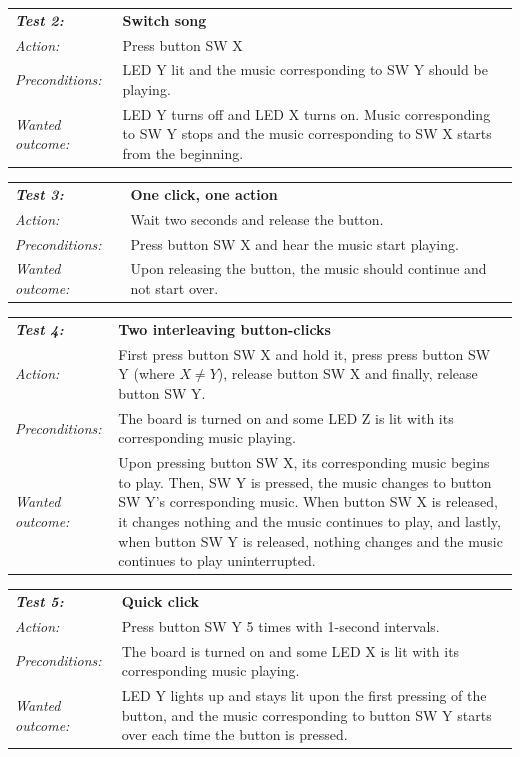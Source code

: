 \documentclass[a4paper,12pt]{article}
\begin{document}
\begin{tabular}[h]{|lp{12cm}|} \hline
\textbf{\emph{Test 2:}} 		& \textbf{Switch song}\\
\emph{Action:} 		& Press button SW X\\
\emph{Preconditions:}	& LED Y lit and the music corresponding to SW Y should be playing.\\
\emph{Wanted outcome:}	& LED Y turns off and LED X turns on. Music corresponding to SW Y stops and the music corresponding to SW X starts from the beginning.\\ \hline
\end{tabular}
\vspace{1cm}

\begin{tabular}[h]{|lp{12cm}|} \hline
\textbf{\emph{Test 3:}} 		& \textbf{One click, one action}\\
\emph{Action:} 		& Wait two seconds and release the button.\\
\emph{Preconditions:}	& Press button SW X and hear the music start playing.\\
\emph{Wanted outcome:}	& Upon releasing the button, the music should continue and not start over. \\ \hline
\end{tabular}
\vspace{1cm}

\begin{tabular}[h]{|lp{12cm}|} \hline
\textbf{\emph{Test 4:}} 		& \textbf{Two interleaving button-clicks}\\
\emph{Action:} 		& First press button SW X and hold it, press press button SW Y (where $X \neq Y$), release button SW X and finally, release button SW Y. \\
\emph{Preconditions:}	& The board is turned on and some LED Z is lit with its corresponding music playing.\\
\emph{Wanted outcome:}	& Upon pressing button SW X, its corresponding music begins to play. Then, SW Y is pressed, the music changes to button SW Y's corresponding music. When button SW X is released, it changes nothing and the music continues to play, and lastly, when button SW Y is released, nothing changes and the music continues to play uninterrupted. \\ \hline
\end{tabular}
\vspace{1cm}

\begin{tabular}[h]{|lp{12cm}|} \hline
\textbf{\emph{Test 5:}} 		& \textbf{Quick click}\\
\emph{Action:} 		& Press button SW Y 5 times with 1-second intervals.\\
\emph{Preconditions:}	& The board is turned on and some LED X is lit with its corresponding music playing.\\
\emph{Wanted outcome:}	& LED Y lights up and stays lit upon the first pressing of the button, and the music corresponding to button SW Y starts over each time the button is pressed.\\ \hline
\end{tabular}
\end{document}
